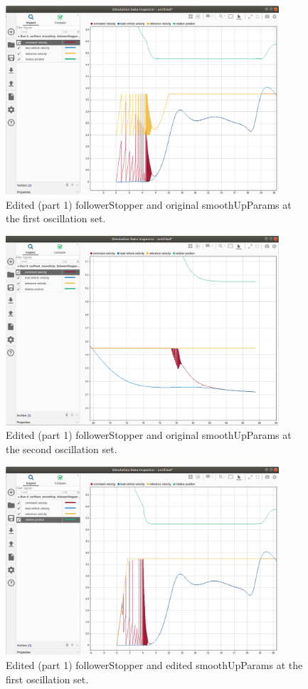\documentclass[12pt, letterpaper]{article}
\begin{document}
\begin{figure}[h]
\begin{center}
\includegraphics[width=4in]{editedFS_originalSUP_2}
\caption{Edited (part 1) followerStopper and original smoothUpParams at the first oscillation set.}
\label{default}
\end{center}
\end{figure}

\begin{figure}[h]
\begin{center}
\includegraphics[width=4in]{editedFS_originalSUP_3}
\caption{Edited (part 1) followerStopper and original smoothUpParams at the second oscillation set.}
\label{default}
\end{center}
\end{figure}

\begin{figure}[h]
\begin{center}
\includegraphics[width=4in]{editedFS_editedSUP_2}
\caption{Edited (part 1) followerStopper and edited smoothUpParams at the first oscillation set.}
\label{default}
\end{center}
\end{figure}
\end{document}
